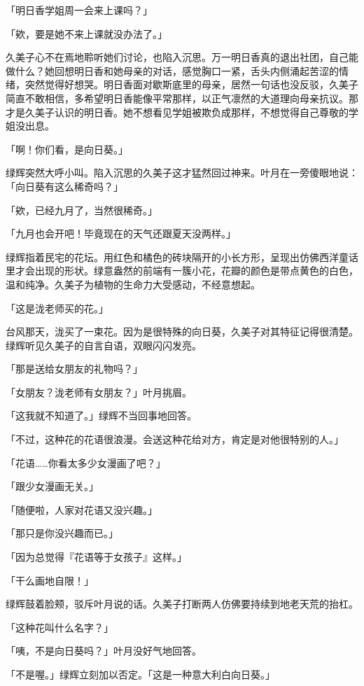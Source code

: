 \documentclass[UTF8]{ctexart}
\begin{document}
    「明日香学姐周一会来上课吗？」 

    「欸，要是她不来上课就没办法了。」 

    久美子心不在焉地聆听她们讨论，也陷入沉思。万一明日香真的退出社团，自己能做什么？她回想明日香和她母亲的对话，感觉胸口一紧，舌头内侧涌起苦涩的情绪，突然觉得好想哭。明日香面对歇斯底里的母亲，居然一句话也没反驳，久美子简直不敢相信，多希望明日香能像平常那样，以正气凛然的大道理向母亲抗议。那才是久美子认识的明日香。她不想看见学姐被欺负成那样，不想觉得自己尊敬的学姐没出息。 

    「啊！你们看，是向日葵。」 

    绿辉突然大呼小叫。陷入沉思的久美子这才猛然回过神来。叶月在一旁傻眼地说：「向日葵有这么稀奇吗？」 

    「欸，已经九月了，当然很稀奇。」 

    「九月也会开吧！毕竟现在的天气还跟夏天没两样。」 

    绿辉指着民宅的花坛。用红色和橘色的砖块隔开的小长方形，呈现出仿佛西洋童话里才会出现的形状。绿意盎然的前端有一簇小花，花瓣的颜色是带点黄色的白色，温和纯净。久美子为植物的生命力大受感动，不经意想起。 

    「这是泷老师买的花。」 

    台风那天，泷买了一束花。因为是很特殊的向日葵，久美子对其特征记得很清楚。绿辉听见久美子的自言自语，双眼闪闪发亮。 

    「那是送给女朋友的礼物吗？」 

    「女朋友？泷老师有女朋友？」叶月挑眉。 

    「这我就不知道了。」绿辉不当回事地回答。 

    「不过，这种花的花语很浪漫。会送这种花给对方，肯定是对他很特别的人。」 

    「花语……你看太多少女漫画了吧？」 

    「跟少女漫画无关。」 

    「随便啦，人家对花语又没兴趣。」 

    「那只是你没兴趣而已。」 

    「因为总觉得『花语等于女孩子』这样。」 

    「干么画地自限！」 

    绿辉鼓着脸颊，驳斥叶月说的话。久美子打断两人仿佛要持续到地老天荒的抬杠。 

    「这种花叫什么名字？」 

    「咦，不是向日葵吗？」叶月没好气地回答。 

    「不是喔。」绿辉立刻加以否定。「这是一种意大利白向日葵。」 
\end{document}
